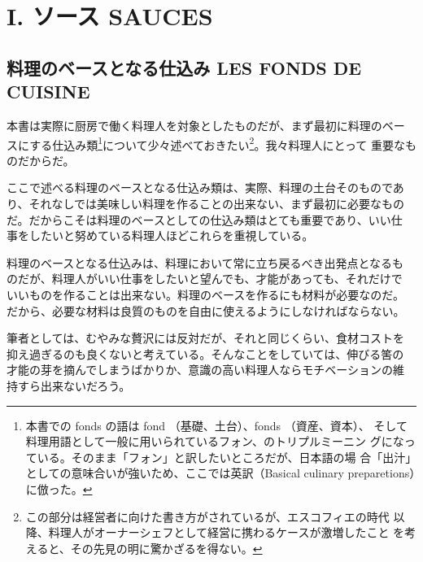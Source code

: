 \documentclass[twoside,12Q,b5paper]{escoffierltjsbook}
\date{}
\newenvironment{recette}{\begin{multicols}{2}}{\end{multicols}}
\renewcommand{\thechapter}{}
\renewcommand{\thesection}{}
\begin{document}





\chapter{I. ソース SAUCES}\label{i.-ux30bdux30fcux30b9-sauces}

\section{料理のベースとなる仕込み LES FONDS DE
CUISINE}\label{ux6599ux7406ux306eux30d9ux30fcux30b9ux3068ux306aux308bux4ed5ux8fbcux307f-les-fonds-de-cuisine}

本書は実際に厨房で働く料理人を対象としたものだが、まず最初に料理のベー
スにする仕込み類\footnote{本書での fonds の語は fond
  （基礎、土台）、fonds （資産、資本）、
  そして料理用語として一般に用いられているフォン、のトリプルミーニン
  グになっている。そのまま「フォン」と訳したいところだが、日本語の場
  合「出汁」としての意味合いが強いため、ここでは英訳（Basical culinary
  preparetions）に倣った。}について少々述べておきたい\footnote{この部分は経営者に向けた書き方がされているが、エスコフィエの時代
  以降、料理人がオーナーシェフとして経営に携わるケースが激増したこと
  を考えると、その先見の明に驚かざるを得ない。}。我々料理人にとって
重要なものだからだ。

ここで述べる料理のベースとなる仕込み類は、実際、料理の土台そのものであ
り、それなしでは美味しい料理を作ることの出来ない、まず最初に必要なもの
だ。だからこそは料理のベースとしての仕込み類はとても重要であり、いい仕
事をしたいと努めている料理人ほどこれらを重視している。

料理のベースとなる仕込みは、料理において常に立ち戻るべき出発点となるも
のだが、料理人がいい仕事をしたいと望んでも、才能があっても、それだけで
いいものを作ることは出来ない。料理のベースを作るにも材料が必要なのだ。
だから、必要な材料は良質のものを自由に使えるようにしなければならない。

筆者としては、むやみな贅沢には反対だが、それと同じくらい、食材コストを
抑え過ぎるのも良くないと考えている。そんなことをしていては、伸びる筈の
才能の芽を摘んでしまうばかりか、意識の高い料理人ならモチベーションの維
持すら出来ないだろう。
\end{document}
